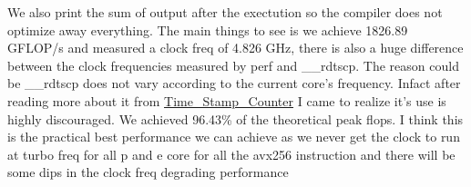 \begin{Shaded}
\begin{Highlighting}[]

 \NormalTok{:}



\end{Highlighting}
\end{Shaded}

We also print the sum of output after the exectution so the compiler
does not optimize away everything. The main things to see is we achieve
1826.89 GFLOP/s and measured a clock freq of 4.826 GHz, there is also a
huge difference between the clock frequencies measured by perf and
\_\_rdtscp. The reason could be \_\_rdtscp does not vary according to
the current core's frequency. Infact after reading more about it from
\href{https://en.wikipedia.org/wiki/Time_Stamp_Counter}{Time\_Stamp\_Counter}
I came to realize it's use is highly discouraged. We achieved 96.43\% of
the theoretical peak flops. I think this is the practical best
performance we can achieve as we never get the clock to run at turbo
freq for all p and e core for all the avx256 instruction and there will
be some dips in the clock freq degrading performance

